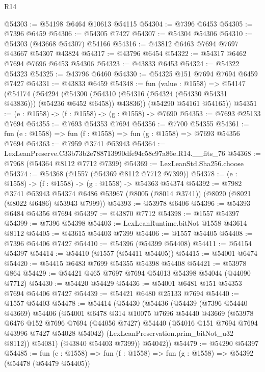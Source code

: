 \begin{lexlean}{R14}
\begin{coremodule}
@54303 := @54198 @6464 @10613 @54115
@54304 := @7396 @6453
@54305 := @7396 @6459
@54306 := @54305 @7427
@54307 := @54304 @54306
@54310 := @54303 (@43668 @54307) @54166
@54316 := @43812 @6463 @7694 @7697 @43667 @54307 @43824
@54317 := @43796 @6454
@54322 := @54317 @6462 @7694 @7696 @6453 @54306
@54323 := @43833 @6453
@54324 := @54322 @54323
@54325 := @43796 @6460
@54330 := @54325 @151 @7694 @7694 @6459 @7427
@54331 := @43833 @6459
@54348 := fun (value : @1558) =>
  @54147
    (@54174
      (@54294
        (@54300 (@54310 (@54316 (@54324 (@54330 @54331 @43836))) (@54236 @6452 @6458)) @43836))
      (@54290 @54161 @54165))
@54351 := (e : @1558) -> (f : @1558) -> (g : @1558) -> @7690
@54353 := @7693 @25133 @7694
@54355 := @7693 @54353 @7694
@54356 := @7700 @54355
@54361 := fun (e : @1558) => fun (f : @1558) => fun (g : @1558) => @7693 @54356 @7694
@54363 := @7959 @3741 @53943
@54364 := LexLeanPreserve.C33b73b2e788713990dfe94c58c97a86e.R14.__fits_76
@54368 := @7968 (@54364 @8112 @7712 @7399)
@54369 := LexLeanStd.Sha256.choose
@54374 := @54368 (@1557 (@54369 @8112 @7712 @7399))
@54378 := (e : @1558) -> (f : @1558) -> (g : @1558) -> @54363 @54374
@54392 := @7982
    @3741
    @53943
    @54374
    @6486
    @53967
    (@8005 (@8014 @3741))
    (@8020 (@8021 (@8022 @6486) @53943 @7999))
@54393 := @53978 @6406
@54396 := @54393 @6484 @54356 @7694
@54397 := @43870 @7712
@54398 := @1557 @54397
@54399 := @7396 @54398
@54403 := LexLeanRuntime.bitNot @1558 @43614 @8112
@54405 := @43615 @54403 @7399
@54406 := @1557 @54405
@54408 := @7396 @54406 @7427
@54410 := @54396 (@54399 @54408)
@54411 := @54154 @54397
@54414 := @54410 (@1557 (@54411 @54405))
@54415 := @54001 @6474
@54420 := @54415 @6483 @7699 @54355 @54398 @54408
@54421 := @53978 @864
@54429 := @54421 @465 @7697 @7694 @54013 @54398 @54044 (@44090 @7712)
@54430 := @54420 @54429
@54436 := @54001 @6481 @151 @54353 @7694 @54406 @7427
@54439 := @54421 @6480 @25133 @7694
@54440 := @1557 @54403
@54478 := @54414
    (@54430
      (@54436
        (@54439
          (@7396 @54440 @43669)
          @54406
          (@54001
            @6478
            @314
            @10075
            @7696
            @54440
            @43669
            (@53978
              @6476
              @152
              @7696
              @7694
              (@44056 @7427)
              @54440
              (@54016 @151 @7694 @7694 @43996 @7427 @54028 @54042)
              (LexLeanPreservation.prim_bitNot_u32 @8112))
            @54081)
          (@43840 @54403 @7399))
        @54042))
@54479 := @54290 @54397
@54485 := fun (e : @1558) => fun (f : @1558) => fun (g : @1558) => @54392 (@54478 (@54479 @54405))

\end{coremodule}
\end{lexlean}
